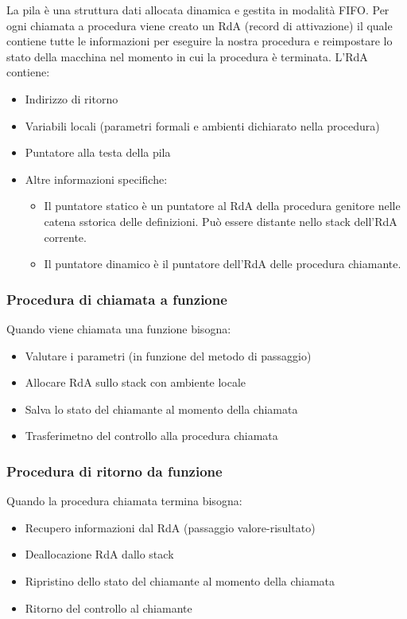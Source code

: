 \documentclass[a4paper]{article}
\begin{document}
La pila è una struttura dati allocata dinamica e gestita in modalità FIFO.
Per ogni chiamata a procedura viene creato un RdA (record di attivazione)
il quale contiene tutte le informazioni per eseguire la nostra procedura
e reimpostare lo stato della macchina nel momento in cui la procedura
è terminata. L'RdA contiene: 
\begin{itemize}
  \item Indirizzo di ritorno 
  \item Variabili locali (parametri formali e ambienti dichiarato nella procedura)
  \item Puntatore alla testa della pila 
  \item Altre informazioni specifiche:
  \begin{itemize}
    \item   Il puntatore statico è un puntatore al RdA della
    procedura genitore nelle catena sstorica delle definizioni.
    Può essere distante nello stack dell'RdA corrente. 
    \item Il puntatore dinamico è il puntatore dell'RdA delle procedura chiamante.
  \end{itemize}
\end{itemize}

\subsubsection{Procedura di chiamata a funzione}

Quando viene chiamata una funzione bisogna:
\begin{itemize}
  \item Valutare i parametri (in funzione del metodo di passaggio) 
  \item Allocare RdA sullo stack con ambiente locale 
  \item Salva lo stato del chiamante al momento della chiamata
  \item Trasferimetno del controllo alla procedura chiamata 
\end{itemize}

\subsubsection*{Procedura di ritorno da funzione} 

Quando la procedura chiamata termina bisogna:

\begin{itemize}
  \item Recupero informazioni dal RdA (passaggio valore-risultato) 
  \item Deallocazione RdA dallo stack
  \item Ripristino dello stato del chiamante al momento della chiamata
  \item Ritorno del controllo al chiamante 
\end{itemize}
\end{document}
